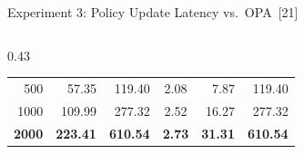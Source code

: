 \documentclass[aspectratio=169,10pt]{beamer}
\begin{document}
\begin{frame}[t]{Experiment 3: Policy Update Latency vs.\ OPA~[21]}
\begin{columns}[T,onlytextwidth]
\begin{column}{0.43\textwidth}
\begin{tabular}{@{}r rr c rr@{}}
\tiny 500  & \tiny 57.35  & \tiny 119.40 & \tiny 2.08 & \tiny 7.87  & \tiny 119.40 \\
\tiny 1000 & \tiny 109.99 & \tiny 277.32 & \tiny 2.52 & \tiny 16.27 & \tiny 277.32 \\
\tiny\bfseries 2000 & \tiny\bfseries 223.41 & \tiny\bfseries 610.54 & \tiny\bfseries 2.73 & \tiny\bfseries 31.31 & \tiny\bfseries 610.54 \\
\bottomrule
\end{tabular}
\end{column}
\end{columns}
\end{frame}

\end{document}
